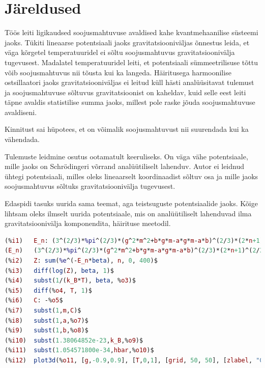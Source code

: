 \documentclass{trkut}%
\begin{document}
\section{Järeldused}




Töös leiti ligikaudsed soojusmahtuvuse avaldised kahe kvantmehaanilise süsteemi jaoks.
Tükiti lineaarse potentsiaali jaoks gravitatsiooniväljas õnnestus leida, et väga kõrgetel temperatuuridel ei sõltu soojusmahtuvus gravitatsioonivälja tugevusest. Madalatel temperatuuridel leiti, et potentsiaali sümmeetrilisuse tõttu võib soojusmahtuvus nii tõusta kui ka langeda. Häiritusega harmoonilise ostsillaatori jaoks gravitatsiooniväljas ei leitud küll hästi analüüsitavat tulemust ja soojusmahtuvuse sõltuvus gravitatsioonist on kaheldav, kuid selle eest leiti täpne avaldis statistilise summa jaoks, millest pole raske jõuda soojusmahtuvuse avaldiseni.

Kinnitust sai hüpotees, et on võimalik soojusmahtuvust nii suurendada kui ka vähendada.

Tulemuste leidmine osutus ootamatult keeruliseks.
On väga vähe potentsiaale, mille jaoks on Schrödingeri võrrand analüütiliselt lahenduv.
Autor ei leidnud ühtegi potentsiaali, milles oleks lineaarselt koordinaadist sõltuv osa ja mille jaoks soojusmahtuvus sõltuks gravitatsioonivälja tugevusest.

Edaspidi tasuks uurida sama teemat, aga teistsuguste potentsiaalide jaoks. Kõige lihtsam oleks ilmselt uurida potentsiaale, mis on analüütiliselt lahenduvad ilma gravitatsioonivälja komponendita, häirituse meetodil.

\printbibliography
{} \label{maximalisa}
\begin{lstlisting}[language=Maxima, breaklines=true]
(%i1)	E_n: (3^(2/3)*%pi^(2/3)*(g^2*m^2+b*g*m-a*g*m-a*b)^(2/3)*(2*n+1)^(2/3)*hbar^(2/3))/(2^(5/3)*(b+a)^(2/3)*m^(1/3));
(E_n)	(3^(2/3)*%pi^(2/3)*(g^2*m^2+b*g*m-a*g*m-a*b)^(2/3)*(2*n+1)^(2/3)*hbar^(2/3))/(2^(5/3)*(b+a)^(2/3)*m^(1/3))
(%i2)	Z: sum(%e^(-E_n*beta), n, 0, 400)$
(%i3)	diff(log(Z), beta, 1)$
(%i4)	subst(1/(k_B*T), beta, %o3)$
(%i5)	diff(%o4, T, 1)$
(%i6)	C: -%o5$
(%i7)	subst(1,m,C)$
(%i8)	subst(1,a,%o7)$
(%i9)	subst(1,b,%o8)$
(%i10)	subst(1.38064852e-23,k_B,%o9)$
(%i11)	subst(1.054571800e-34,hbar,%o10)$
(%i12)	plot3d(%o11, [g,-0.9,0.9], [T,0,1], [grid, 50, 50], [zlabel, "C"], [gnuplot_pm3d,true]);
\end{lstlisting}

\end{document}

